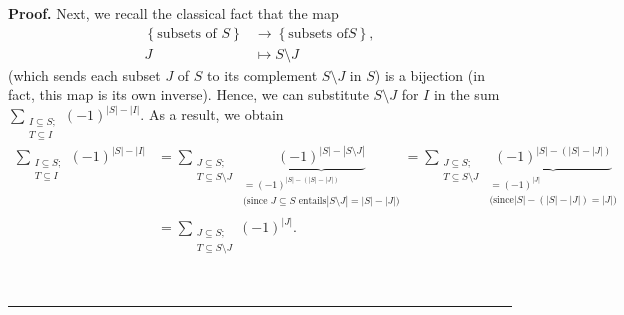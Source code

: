 \documentclass[numbers=enddot,12pt,final,onecolumn,notitlepage]{scrartcl}%
\theoremstyle{definition}
\newenvironment{proof}[1][Proof]{\noindent\textbf{#1.} }{\ \rule{0.5em}{0.5em}}
\let\sumnonlimits\sum
\renewcommand{\sum}{\sumnonlimits\limits}
\newenvironment{verlong}{}{}
\begin{document}
\begin{verlong}
\begin{proof}
Next, we recall the classical fact that the map%
\begin{align*}
\left\{  \text{subsets of }S\right\}   &  \rightarrow\left\{  \text{subsets of
}S\right\}  ,\\
J  &  \mapsto S\setminus J
\end{align*}
(which sends each subset $J$ of $S$ to its complement $S\setminus J$ in $S$)
is a bijection (in fact, this map is its own inverse). Hence, we can
substitute $S\setminus J$ for $I$ in the sum $\sum_{\substack{I\subseteq
S;\\T\subseteq I}}\left(  -1\right)  ^{\left\vert S\right\vert -\left\vert
I\right\vert }$. As a result, we obtain%
\begin{align}
\sum_{\substack{I\subseteq S;\\T\subseteq I}}\left(  -1\right)  ^{\left\vert
S\right\vert -\left\vert I\right\vert }  &  =\sum_{\substack{J\subseteq
S;\\T\subseteq S\setminus J}}\underbrace{\left(  -1\right)  ^{\left\vert
S\right\vert -\left\vert S\setminus J\right\vert }}_{\substack{=\left(
-1\right)  ^{\left\vert S\right\vert -\left(  \left\vert S\right\vert
-\left\vert J\right\vert \right)  }\\\text{(since }J\subseteq S\text{ entails
}\left\vert S\setminus J\right\vert =\left\vert S\right\vert -\left\vert
J\right\vert \text{)}}}=\sum_{\substack{J\subseteq S;\\T\subseteq S\setminus
J}}\underbrace{\left(  -1\right)  ^{\left\vert S\right\vert -\left(
\left\vert S\right\vert -\left\vert J\right\vert \right)  }}%
_{\substack{=\left(  -1\right)  ^{\left\vert J\right\vert }\\\text{(since
}\left\vert S\right\vert -\left(  \left\vert S\right\vert -\left\vert
J\right\vert \right)  =\left\vert J\right\vert \text{)}}}\nonumber\\
&  =\sum_{\substack{J\subseteq S;\\T\subseteq S\setminus J}}\left(  -1\right)
^{\left\vert J\right\vert }. \label{pf.lem.altsum.1.long.2}%
\end{align}



\end{proof}
\end{verlong}
\end{document}
